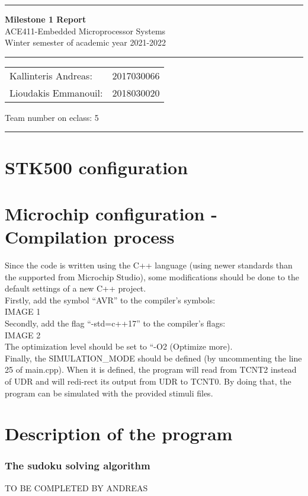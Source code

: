 \documentclass[12pt, a4]{article}
\begin{document}
\noindent \rule{\textwidth}{3pt}
\begin{center}
	{\bf \Large{Milestone 1 Report}}\\
	ACE411-Embedded Microprocessor Systems \\
	Winter semester of academic year 2021-2022
	\rule{\textwidth}{0.2mm} 
	\begin{tabular}{l r}
		Kallinteris Andreas:& 2017030066 \\ 
		Lioudakis Emmanouil:      &2018030020 
	\end{tabular} \vrule \hspace{3mm}
	\indent	Team number on eclass:  5
	\rule{\textwidth}{1pt}
\end{center}

\section*{STK500 configuration}

\section*{Microchip configuration - Compilation process}
Since the code is written using the C++ language (using newer standards than the supported from Microchip Studio), some modifications should be done to the default settings of a new C++ project.  \\
Firstly, add the symbol “AVR” to the compiler’s symbols:\\
IMAGE 1\\
Secondly, add the flag “-std=c++17” to the compiler’s flags:\\
IMAGE 2\\
The optimization level should be set to “-O2 (Optimize more).\\
Finally, the SIMULATION\_MODE should be defined (by uncommenting the line 25 of main.cpp). When it is defined, the program will read from TCNT2 instead of UDR and will redi-rect its output from UDR to TCNT0. By doing that, the program can be simulated with the provided stimuli files.

\section*{Description of the program}

\subsubsection*{The sudoku solving algorithm}
TO BE COMPLETED BY ANDREAS
\end{document}
